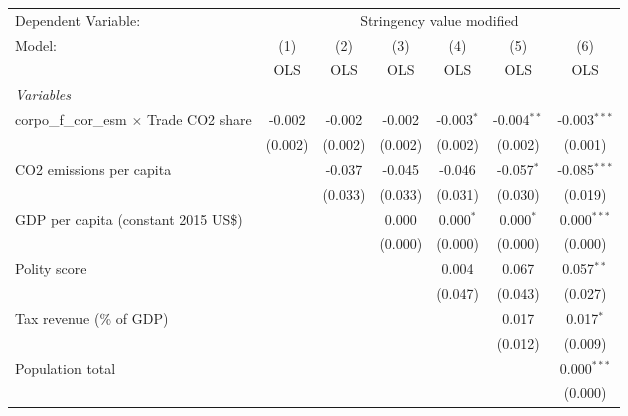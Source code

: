 
\begingroup
\centering
\begin{tabular}{lcccccc}
   \toprule
   Dependent Variable: & \multicolumn{6}{c}{Stringency value modified}\\
   Model:                                          & (1)     & (2)     & (3)     & (4)          & (5)           & (6)\\  
                                                   &  OLS    & OLS     & OLS     & OLS          & OLS           & OLS\\  
   \midrule
   \emph{Variables}\\
   corpo\_f\_cor\_esm $\times$ Trade CO2 share     & -0.002  & -0.002  & -0.002  & -0.003$^{*}$ & -0.004$^{**}$ & -0.003$^{***}$\\   
                                                   & (0.002) & (0.002) & (0.002) & (0.002)      & (0.002)       & (0.001)\\   
   CO2 emissions per capita                        &         & -0.037  & -0.045  & -0.046       & -0.057$^{*}$  & -0.085$^{***}$\\   
                                                   &         & (0.033) & (0.033) & (0.031)      & (0.030)       & (0.019)\\   
   GDP per capita (constant 2015 US\$)             &         &         & 0.000   & 0.000$^{*}$  & 0.000$^{*}$   & 0.000$^{***}$\\   
                                                   &         &         & (0.000) & (0.000)      & (0.000)       & (0.000)\\   
   Polity score                                    &         &         &         & 0.004        & 0.067         & 0.057$^{**}$\\   
                                                   &         &         &         & (0.047)      & (0.043)       & (0.027)\\   
   Tax revenue (\% of GDP)                         &         &         &         &              & 0.017         & 0.017$^{*}$\\   
                                                   &         &         &         &              & (0.012)       & (0.009)\\   
   Population total                                &         &         &         &              &               & 0.000$^{***}$\\   
                                                   &         &         &         &              &               & (0.000)\\   

\end{tabular}
